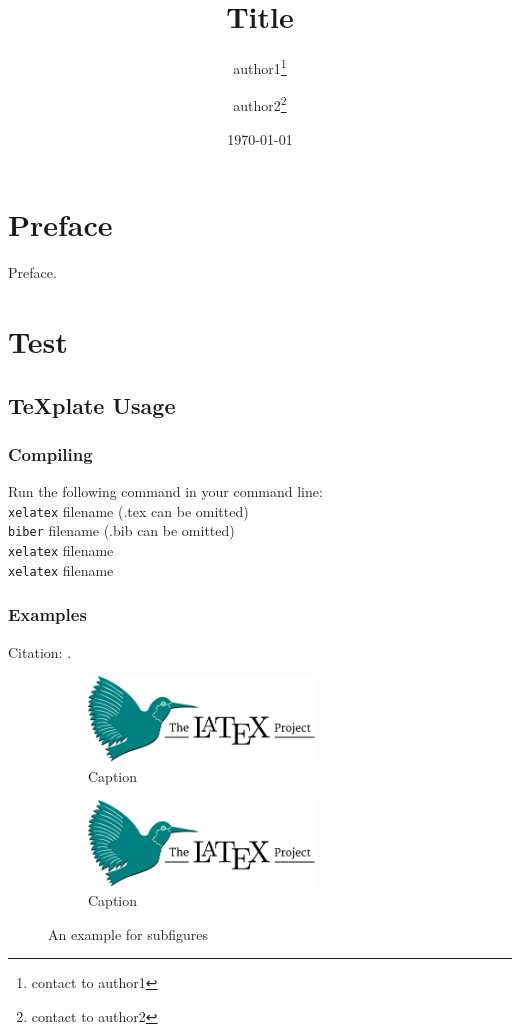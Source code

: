 \documentclass[openany, a5paper]{book}
\title{Title}
\author{ author1\thanks{contact to author1}
	\and
		author2\thanks{contact to author2}}
\date{\today} %
\begin{document}
\maketitle %
\frontmatter
\chapter{Preface}
Preface.

\tableofcontents

\mainmatter
\chapter{Test}
\section{\texorpdfstring{\TeX{}plate Usage}{TeXplate Usage}}
\subsection{Compiling}

Run the following command in your command line:\\[0pt]
\verb|xelatex| filename (.tex can be omitted)\\
\verb|biber| filename (.bib can be omitted)\\
\verb|xelatex| filename\\
\verb|xelatex| filename

\subsection{Examples}

Citation: \cite{Knuth}.

\begin{figure}[h] %
\centering
\begin{subfigure}{.5\textwidth}
	\centering
	\includegraphics[width=6cm]{latex-project-logo.pdf}
	\caption{Caption}
	\label{subfigure1}
\end{subfigure}%
\begin{subfigure}{.5\textwidth}
	\centering
	\includegraphics[width=6cm]{latex-project-logo.pdf}
	\caption{Caption}
	\label{subfigure2}
\end{subfigure}
\caption{An example for subfigures}
\end{figure}
\end{document}
